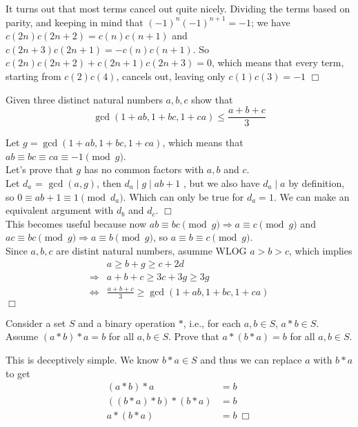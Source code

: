 \begin{solution}[-1]
    It turns out that most terms cancel out quite nicely. Dividing the terms based on parity, and keeping in mind that $(-1)^n(-1)^{n+1} = -1$; we have $c(2n)c(2n+2) = c(n)c(n+1)$ and $c(2n+3)c(2n+1) = -c(n)c(n+1)$. So $c(2n)c(2n+2) + c(2n+1)c(2n+3) = 0$, which means that every term, starting from $c(2)c(4)$, cancels out, leaving only $c(1)c(3) = -1$ $\Box$
\end{solution}

\begin{problem}[N][6][St. Petersburg 2008/ ]
    Given three distinct natural numbers $a,b,c$ show that
    $$ \gcd (1+ab,1+bc,1+ca) \leq \frac{a+b+c}{3} $$ 
\end{problem}

\begin{solution}
    Let $g = \gcd (1+ab,1+bc,1+ca)$, which means that 
    $ab \equiv bc \equiv ca \equiv -1 \pmod g$. \\[3mm]
    Let's prove that $g$ has no common factors with $a,b$ and $c$. \\
    Let $d_a$ = $\gcd(a,g)$, then $d_a \mid g \mid ab+1$ , but we also have $d_a \mid a$ by definition, so  $0  \equiv ab +1 \equiv1 \pmod {d_a}$. Which can only be true for $d_a=1$. We can make an equivalent argument with $d_b$ and $d_c$. $\Box$ \\[2mm]
    This becomes useful because now $ab \equiv bc \pmod g \Rightarrow a \equiv c \pmod g$ and $ac \equiv bc \pmod g \Rightarrow a \equiv b \pmod g$, so $a \equiv b \equiv c \pmod g$. \\[2mm]
    Since $a,b,c$ are distint natural numbers, asumme WLOG $a>b>c$, which implies 
    \begin{align*}
        &a \geq b + g \geq c + 2d \\
        \Rightarrow &a + b + c \geq 3c + 3g \geq 3g \\
        \iff &\frac{a+b+c}{3} \geq \gcd (1+ab,1+bc,1+ca)
    \end{align*}
    $\Box$
\end{solution}

\begin{problem}[R][6][Putnam 2001/A1]
    Consider a set $S$ and a binary operation $*$, i.e., for each $a,b \in S$, $a*b \in S$. Assume $(a*b)*a = b$ for all $a,b \in S$. Prove that $a * (b * a) = b$ for all $a,b \in S$.
\end{problem}

\begin{solution}
    This is deceptively simple. We know $b*a\in S$ and thus we can replace $a$ with $b*a$ to get
    \begin{align*}
            (a*b)*a &= b\\
            ((b*a)*b)*(b*a) &= b\\
            a*(b*a) &= b \ \Box
    \end{align*}
\end{solution}

